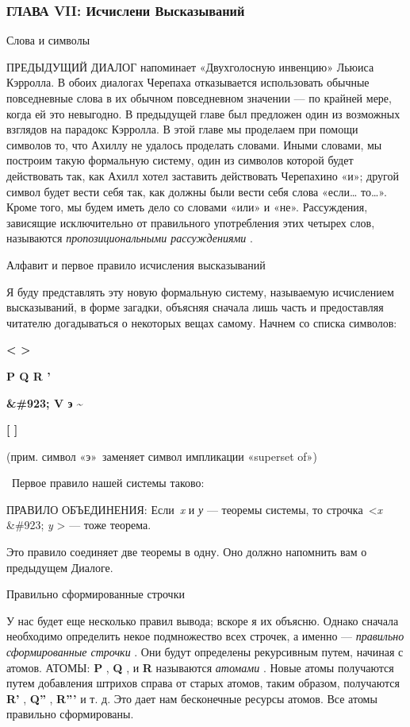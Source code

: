 \subsubsection{ГЛАВА VII: Исчислени Высказываний}

Слова и символы

ПРЕДЫДУЩИЙ ДИАЛОГ напоминает «Двухголосную инвенцию» Льюиса Кэрролла. В обоих диалогах Черепаха отказывается использовать обычные повседневные слова в их обычном повседневном значении --- по крайней мере, когда ей это невыгодно. В предыдущей главе был предложен один из возможных взглядов на парадокс Кэрролла. В этой главе мы проделаем при помощи символов то, что Ахиллу не удалось проделать словами. Иными словами, мы построим такую формальную систему, один из символов которой будет действовать так, как Ахилл хотел заставить действовать Черепахино «и»; другой символ будет вести себя так, как должны были вести себя слова «если\ldots{} то\ldots». Кроме того, мы будем иметь дело со словами «или» и «не». Рассуждения, зависящие исключительно от правильного употребления этих четырех слов, называются \emph{пропозициональными рассуждениями} .

Алфавит и первое правило исчисления высказываний

Я буду представлять эту новую формальную систему, называемую исчислением высказываний, в форме загадки, объясняя сначала лишь часть и предоставляя читателю догадываться о некоторых вещах самому. Начнем со списка символов:

\textbf{\textless{} \textgreater{}}

\textbf{P Q R '}

\textbf{\&\#923; V э \textasciitilde{}}

\textbf{{[} {]}}

(прим. символ «э»~заменяет символ импликации «superset of»)

~Первое правило нашей системы таково:

ПРАВИЛО ОБЪЕДИНЕНИЯ: Если~\emph{x} и \emph{у} --- теоремы системы, то строчка~\textless{}\emph{x} \&\#923; \emph{y} \textgreater{} --- тоже теорема.

Это правило соединяет две теоремы в одну. Оно должно напомнить вам о предыдущем Диалоге.

Правильно сформированные строчки

У нас будет еще несколько правил вывода; вскоре я их объясню. Однако сначала необходимо определить некое подмножество всех строчек, а именно --- \emph{правильно сформированные строчки} . Они будут определены рекурсивным путем, начиная с атомов. АТОМЫ: \textbf{P} , \textbf{Q} , и \textbf{R} называются \emph{атомами} . Новые атомы получаются путем добавления штрихов справа от старых атомов, таким образом, получаются \textbf{R'} , \textbf{Q''} , \textbf{R'''} и т. д. Это дает нам бесконечные ресурсы атомов. Все атомы правильно сформированы.

